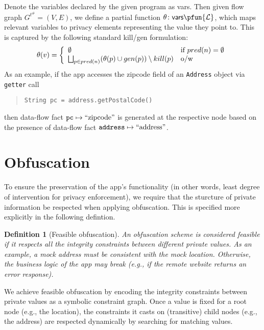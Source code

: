 \documentclass[]{article}
\newtheorem{definition}{Definition}[section]
\begin{document}
Denote the variables declared by the given program as {\sf vars}. Then 
given flow graph $G^{t^{\#}}=(V,E)$, we define a partial function $\theta \colon {\sf vars} \pfun {\cal L}$, which maps relevant variables to privacy elements representing the value they point to. This is captured by the following standard kill/gen formulation:
$$
\theta(v) = \left\{ 
\begin{array}{l l}
\emptyset & \textnormal{if $pred(n)=\emptyset$} \\
\bigsqcup_{p \in pred(n)} (\theta(p) \cup gen(p)) \setminus kill(p) & \textnormal{o/w}
\end{array} \right.
$$
As an example, if the app accesses the zipcode field of an {\tt Address} object via {\tt getter} call
\begin{quote}
	 {\tt String pc = address.getPostalCode()}
\end{quote}
then data-flow fact ${\tt pc} \mapsto \textnormal{``zipcode''}$ is generated at the respective node based on the presence of data-flow fact ${\tt address} \mapsto \textnormal{``address''}$.

\section{Obfuscation}

To ensure the preservation of the app's functionality (in other words, least degree of intervention for privacy enforcement), we 
require that the sturcture of private information be respected when applying obfuscation. This is specified more explicitly in the following defintion. 

\begin{definition}[Feasible obfuscation]
	An obfuscation scheme is considered \emph{feasible} if it respects all the integrity constraints between different private values. As an example, a mock address must be consistent with the mock location. Otherwise, the business logic of the app may break (e.g., if the remote website returns an error response).
\end{definition}

We achieve feasible obfuscation by encoding the integrity constraints between private values as a symbolic constraint graph. Once a value is fixed for a root node (e.g., the location), the constraints it casts on (transitive) child nodes (e.g., the address) are respected dynamically by searching for matching values.
\end{document}
